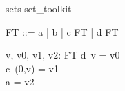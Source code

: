 \documentclass{article}
\begin{document}
\begin{zsection}
\SECTION sets \parents set\_toolkit
\end{zsection}

\begin{zed}
   FT ::= a | b | c \ldata \nat \cross FT \rdata | d \ldata FT \rdata
\end{zed}

\begin{axdef}
   v, v0, v1, v2: FT
\where
   d~v     = v0 \\
   c~(0,v) = v1 \\
   a       = v2 
\end{axdef}
\end{document}
